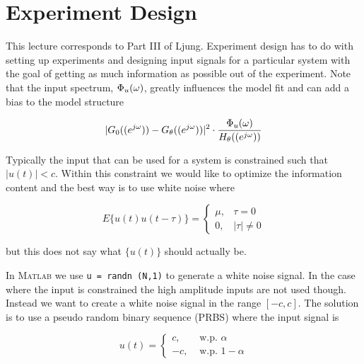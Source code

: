 \mainmatter%
\setcounter{page}{1}

\lectureseries[\course]{\course}

\date{December 8, 2009}

\setaddress%

\setcounter{lecture}{18}
\setcounter{chapter}{18}


\section{Experiment Design}
This lecture corresponds to Part III of Ljung.
Experiment design has to do with setting up experiments and designing input signals for a particular system with the goal of getting as much information as possible out of the experiment.
Note that the input spectrum, $\Phi_u(\omega)$, greatly influences the model fit and can add a bias to the model structure

\begin{equation*}
|G_0((e^{j\omega}))-G_\theta((e^{j\omega}))|^2 \cdot \frac{\Phi_u(\omega)}{H_\theta((e^{j\omega}))}
\end{equation*}

Typically the input that can be used for a system is constrained such that $|u(t)|<c$.
Within this constraint we would like to optimize the information content and the best way is to use white noise where

\begin{equation*}
E\{u(t)u(t-\tau)\} = \begin{cases} \mu, & \tau=0 \\ 0, & |\tau|\neq0 \end{cases}
\end{equation*}

but this does not say what $\{u(t)\}$ should actually be.

In \textsc{Matlab} we use \texttt{u = randn (N,1)} to generate a white noise signal.
In the case where the input is constrained the high amplitude inputs are not used though.
Instead we want to create a white noise signal in the range $[-c,c]$.
The solution is to use a pseudo random binary sequence (PRBS) where the input signal is

\begin{equation*}
u(t) = \begin{cases} c, & \text{~w.p.~} \alpha \\ -c, & \text{~w.p.~} 1-\alpha \end{cases}
\end{equation*}

